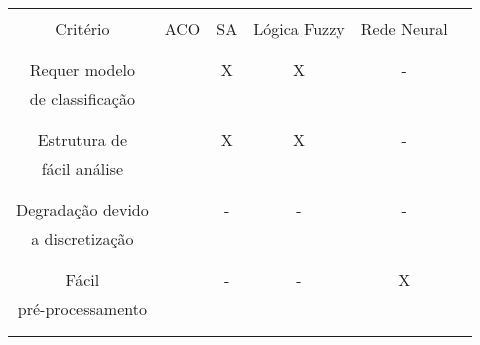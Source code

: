 

 \begin{table}
   \begin{center}
     \begin{tabular}{|c|c|c|c|c|c|}
       \hline
                         &      &          &              &            \\
       Critério          &  ACO &    SA    & Lógica Fuzzy & Rede Neural\\
                         &      &          &              &            \\
       \hline
                         &      &          &              &            \\
       Requer modelo     &      &    X     &      X       &      -     \\
       de classificação  &      &          &              &            \\
                         &      &          &              &            \\
       \hline
                         &      &          &              &            \\
       Estrutura de      &      &    X     &      X       &      -     \\
       fácil análise     &      &          &              &            \\
                         &      &          &              &            \\
       \hline
                         &      &          &              &            \\
       Degradação devido &      &    -     &      -       &      -     \\
       a discretização   &      &          &              &            \\
                         &      &          &              &            \\
       \hline
                         &      &          &              &            \\
       Fácil             &      &    -     &      -       &      X     \\
       pré-processamento &      &          &              &            \\
                         &      &          &              &            \\
       \hline
                         &      &          &              &            \\

\end{tabular}
\end{center}
\end{table}

